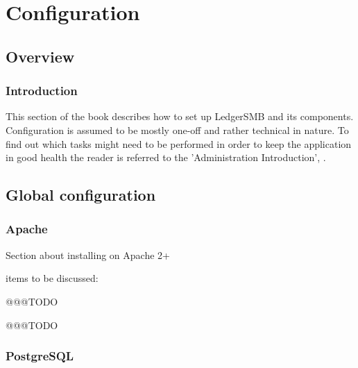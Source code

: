 
\part{Configuration}
\label{part-configuration}


\chapter{Overview}
\label{cha-configuration-overview}

\section{Introduction}
\label{sec-config-overview-introduction}
This section of the book describes how to set up LedgerSMB and its components.
Configuration  is assumed to be mostly one-off and rather technical in nature.  To find
out which tasks might need to be performed in order to keep the application in good
health the reader is referred to the 'Administration Introduction', .

\chapter{Global configuration}
\label{cha-global-configuration}

\section{Apache}
\label{sec-global-config-apache}

Section about installing on  Apache 2+

items to be discussed:

\begin{description}[style=nextline]
\item [Forwarding of authentication] @@@TODO

\item [PSGI configuration] @@@TODO

\end{description}

\section{PostgreSQL}
\label{sec-global-config-postgresql}

